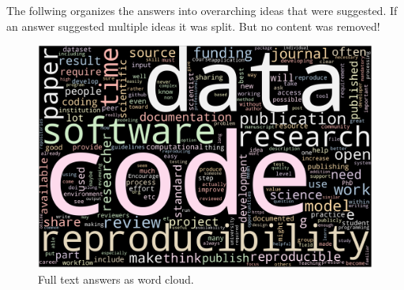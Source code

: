 \documentclass{article}
\begin{document}
The follwing organizes the answers into overarching ideas that were suggested. If an answer suggested multiple ideas it was split. But no content was removed!

\begin{figure}[!h]
    \centering
    \includegraphics[width=\textwidth]{../word_cloud.png}
	\caption{Full text answers as word cloud.}
    \label{fig:wc}
\end{figure}
\end{document}
